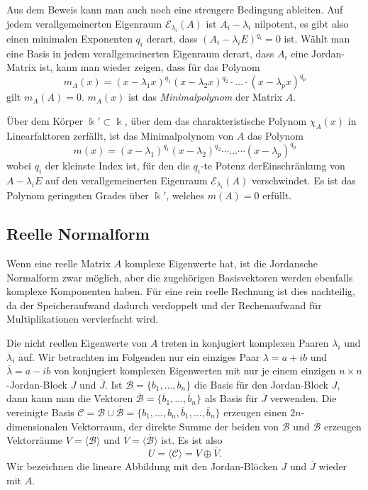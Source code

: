 Aus dem Beweis kann man auch noch eine strengere Bedingung ableiten.
Auf jedem verallgemeinerten Eigenraum $\mathcal{E}_{\lambda_i}(A)$
ist $A_i-\lambda_i$ nilpotent, es gibt also einen minimalen Exponenten
$q_i$ derart, dass $(A_i-\lambda_iE)^{q_i}=0$ ist.
Wählt man eine Basis in jedem verallgemeinerten Eigenraum derart,
dass $A_i$ eine Jordan-Matrix ist, kann man wieder zeigen, dass
für das Polynom
\[
m_A(x)
=
(x-\lambda_1x)^{q_1}
(x-\lambda_2x)^{q_2}
\cdot
\ldots
\cdot
(x-\lambda_px)^{q_p}
\]
gilt $m_A(A)=0$.
$m_A(x)$ ist das {\em Minimalpolynom} der Matrix $A$.
%

\begin{satz}[Minimalpolynom]
Über dem Körper $\Bbbk'\subset\Bbbk$, über dem das charakteristische
Polynom $\chi_A(x)$ in Linearfaktoren zerfällt, ist das Minimalpolynom
von $A$ das Polynom
\[
m(x)
=
(x-\lambda_1)^{q_1}
(x-\lambda_2)^{q_2}
\cdots
\ldots
\cdots
(x-\lambda_p)^{q_p}
\]
wobei $q_i$ der kleinste Index ist, für den die $q_i$-te Potenz
derEinschränkung von $A-\lambda_i E$ auf den verallgemeinerten Eigenraum
$\mathcal{E}_{\lambda_i}(A)$ verschwindet.
Es ist das Polynom geringsten Grades über $\Bbbk'$, welches $m(A)=0$ erfüllt.
\end{satz}


\subsection{Reelle Normalform
\label{buch:subsection:reelle-normalform}}
Wenn eine reelle Matrix $A$ komplexe Eigenwerte hat, ist die Jordansche
Normalform zwar möglich, aber die zugehörigen Basisvektoren werden ebenfalls
komplexe Komponenten haben.
Für eine rein reelle Rechnung ist dies nachteilig, da der Speicheraufwand
dadurch verdoppelt und der Rechenaufwand für Multiplikationen vervierfacht
wird.

Die nicht reellen Eigenwerte von $A$ treten in konjugiert komplexen Paaren
$\lambda_i$ und $\overline{\lambda}_i$ auf.
Wir betrachten im Folgenden nur ein einziges Paar $\lambda=a+ib$ und
$\overline{\lambda}=a-ib$ von konjugiert komplexen Eigenwerten mit
nur je einem einzigen $n\times n$-Jordan-Block $J$ und $\overline{J}$.
Ist $\mathcal{B}=\{b_1,\dots,b_n\}$ die Basis für den Jordan-Block $J$,
dann kann man die Vektoren
$\overline{\mathcal{B}}=\{\overline{b}_1,\dots,\overline{b}_n\}$ als Basis für
$\overline{J}$ verwenden.
Die vereinigte Basis
$\mathcal{C} = \mathcal{B}\cup\overline{\mathcal{B}}
= \{b_1,\dots,b_n,\overline{b}_1,\dots,\overline{b}_n\}$
erzeugen einen $2n$-dimensionalen Vektorraum,
der direkte Summe der beiden von $\mathcal{B}$ und $\overline{\mathcal{B}}$
erzeugen Vektorräume $V=\langle\mathcal{B}\rangle$ und
$\overline{V}=\langle\overline{\mathcal{B}}\rangle$ ist.
Es ist also
\[
U=\langle \mathcal{C}\rangle
=
V\oplus \overline{V}.
\]
Wir bezeichnen die lineare Abbildung mit den Jordan-Blöcken
$J$ und $\overline{J}$ wieder mit $A$.

